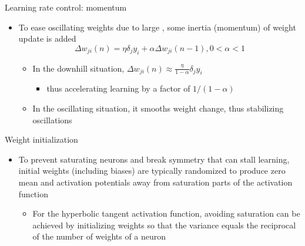 \documentclass[notes]{beamer}
\providecommand{\tightlist}{%
  \setlength{\itemsep}{0pt}\setlength{\parskip}{0pt}}
\begin{document}
\begin{frame}{Learning rate control: momentum}

\begin{itemize}
\item
  To ease oscillating weights due to large , some inertia (momentum) of
  weight update is added
  \[     \Delta   w_{ji} (n) = \eta \delta_ j y_i + \alpha \Delta w_ {ji} (n - 1),                        0 < \alpha < 1\]

  \begin{itemize}
  \tightlist
  \item
    In the downhill situation,
    \(\Delta w_ {ji} (n)\approx \frac{\eta}{1-\alpha} \delta _ j y_i\)

    \begin{itemize}
    \tightlist
    \item
      thus accelerating learning by a factor of \(1/(1 - \alpha )\)
    \end{itemize}
  \item
    In the oscillating situation, it smooths weight change, thus
    stabilizing oscillations
  \end{itemize}
\end{itemize}

\end{frame}

\begin{frame}{Weight initialization}

\begin{itemize}
\tightlist
\item
  To prevent saturating neurons and break symmetry that can stall
  learning, initial weights (including biases) are typically randomized
  to produce zero mean and activation potentials away from saturation
  parts of the activation function

  \begin{itemize}
  \tightlist
  \item
    For the hyperbolic tangent activation function, avoiding saturation
    can be achieved by initializing weights so that the variance equals
    the reciprocal of the number of weights of a neuron
  \end{itemize}
\end{itemize}

\end{frame}
\end{document}
